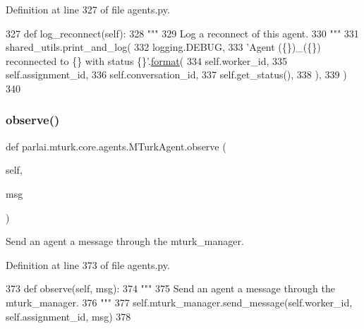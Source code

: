 Definition at line 327 of file agents.\+py.


\begin{DoxyCode}
327     \textcolor{keyword}{def }log\_reconnect(self):
328         \textcolor{stringliteral}{"""}
329 \textcolor{stringliteral}{        Log a reconnect of this agent.}
330 \textcolor{stringliteral}{        """}
331         shared\_utils.print\_and\_log(
332             logging.DEBUG,
333             \textcolor{stringliteral}{'Agent (\{\})\_(\{\}) reconnected to \{\} with status \{\}'}.\hyperlink{namespaceparlai_1_1chat__service_1_1services_1_1messenger_1_1shared__utils_a32e2e2022b824fbaf80c747160b52a76}{format}(
334                 self.worker\_id,
335                 self.assignment\_id,
336                 self.conversation\_id,
337                 self.get\_status(),
338             ),
339         )
340 
\end{DoxyCode}
\mbox{\label{classparlai_1_1mturk_1_1core_1_1agents_1_1MTurkAgent_a702f94fe519f05bc8fb9b382b818112c}} 
\subsubsection{\texorpdfstring{observe()}{observe()}}
{\footnotesize\ttfamily def parlai.\+mturk.\+core.\+agents.\+M\+Turk\+Agent.\+observe (\begin{DoxyParamCaption}\item[{}]{self,  }\item[{}]{msg }\end{DoxyParamCaption})}

\begin{DoxyVerb}Send an agent a message through the mturk_manager.
\end{DoxyVerb}
 

Definition at line 373 of file agents.\+py.


\begin{DoxyCode}
373     \textcolor{keyword}{def }observe(self, msg):
374         \textcolor{stringliteral}{"""}
375 \textcolor{stringliteral}{        Send an agent a message through the mturk\_manager.}
376 \textcolor{stringliteral}{        """}
377         self.mturk\_manager.send\_message(self.worker\_id, self.assignment\_id, msg)
378 
\end{DoxyCode}
\mbox{\label{classparlai_1_1mturk_1_1core_1_1agents_1_1MTurkAgent_afdcfa4b074f379039112935c65463a40}} 
